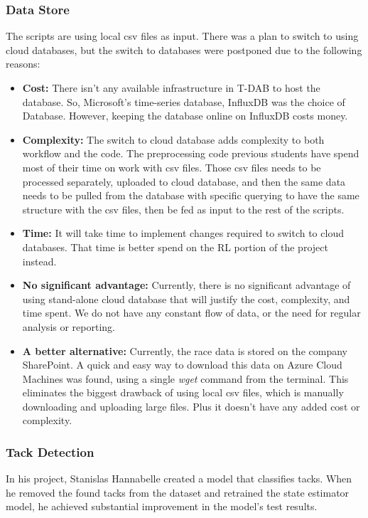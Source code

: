 \documentclass[12pt,twoside]{report}
\begin{document}
\subsubsection{Data Store}
The scripts are using local csv files as input. There was a plan to switch to using cloud databases, but the switch to databases were postponed due to the following reasons:

\begin{itemize}
  \item \textbf{Cost:} There isn't any available infrastructure in T-DAB to host the database. So, Microsoft's time-series database, InfluxDB was the choice of Database. However, keeping the database online on InfluxDB costs money.
  \item \textbf{Complexity:} The switch to cloud database adds complexity to both workflow and the code. The preprocessing code previous students have spend most of their time on work with csv files. Those csv files needs to be processed separately, uploaded to cloud database, and then the same data needs to be pulled from the database with specific querying to have the same structure with the csv files, then be fed as input to the rest of the scripts.
  \item \textbf{Time:} It will take time to implement changes required to switch to cloud databases. That time is better spend on the RL portion of the project instead.
  \item \textbf{No significant advantage:} Currently, there is no significant advantage of using stand-alone cloud database that will justify the cost, complexity, and time spent. We do not have any constant flow of data, or the need for regular analysis or reporting.
  \item \textbf{A better alternative:} Currently, the race data is stored on the company SharePoint. A quick and easy way to download this data on Azure Cloud Machines was found, using a single \textit{wget} command from the terminal. This eliminates the biggest drawback of using local csv files, which is manually downloading and uploading large files. Plus it doesn't have any added cost or complexity.
\end{itemize}

\subsubsection{Tack Detection}
In his project, Stanislas Hannabelle created a model that classifies tacks. When he removed the found tacks from the dataset and retrained the state estimator model, he achieved substantial improvement in the model's test results. 
\end{document}
